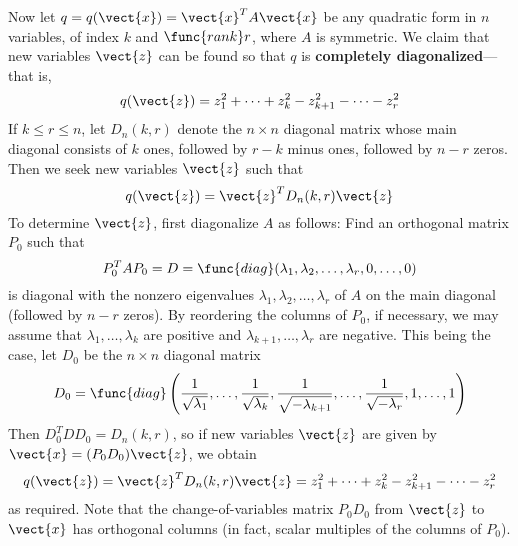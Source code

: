 Now let $q = q(\vect{x}) = \vect{x}^{T}A\vect{x}$ be any quadratic form in $n$ variables, of index $k$ and $\func{rank }r$, where $A$ is symmetric. We claim that new variables $\vect{z}$ can be found so that $q$ is \textbf{completely diagonalized}---that is,
\begin{equation*}
q(\vect{z}) = z_{1}^2 + \cdots + z_{k}^2 - z_{k+1}^2 - \cdots - z_{r}^2
\end{equation*}
If $k \leq r \leq n$, let $D_{n}(k, r)$ denote the $n \times n$ diagonal matrix whose main diagonal consists of $k$ ones, followed by $r - k$ minus ones, followed by $n - r$ zeros. Then we seek new variables $\vect{z}$ such that
\begin{equation*}
q(\vect{z}) = \vect{z}^TD_{n}(k, r)\vect{z}
\end{equation*}
To determine $\vect{z}$, first diagonalize $A$ as follows: Find an orthogonal matrix $P_{0}$ such that
\begin{equation*}
P_{0}^TAP_{0} = D = \func{diag}(\lambda_{1}, \lambda_{2}, \dots, \lambda_{r}, 0, \dots, 0)
\end{equation*}
is diagonal with the nonzero eigenvalues $\lambda_{1}, \lambda_{2}, \dots, \lambda_{r}$ of $A$ on the main diagonal (followed by $n - r$ zeros). By reordering the columns of $P_{0}$, if necessary, we may assume that $\lambda_{1}, \dots, \lambda_{k}$ are positive and $\lambda_{k + 1}, \dots, \lambda_{r}$ are negative. This being the case, let $D_{0}$ be the $n \times n$ diagonal matrix
\begin{equation*}
D_{0} = \func{diag} \left( \frac{1}{\sqrt{\lambda_{1}}}, \dots, \frac{1}{\sqrt{\lambda_{k}}}, \frac{1}{\sqrt{-\lambda_{k+1}}}, \dots, \frac{1}{\sqrt{-\lambda_{r}}}, 1, \dots, 1 \right)
\end{equation*}
Then $D_{0}^{T}DD_{0} = D_{n}(k, r)$, so if new variables $\vect{z}$ are given by $\vect{x} = (P_{0}D_{0})\vect{z}$, we obtain
\begin{equation*}
q(\vect{z}) = \vect{z}^TD_{n}(k, r)\vect{z} = z_{1}^2 + \cdots + z_{k}^2 - z_{k+1}^2 - \cdots - z_{r}^2
\end{equation*}
as required. Note that the change-of-variables matrix $P_{0}D_{0}$ from $\vect{z}$ to $\vect{x}$ has orthogonal columns (in fact, scalar multiples of the columns of $P_{0}$).


